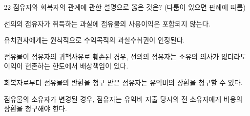 \begin{question}{22}
점유자와 회복자의 관계에 관한 설명으로 옳은 것은? (다툼이 있으면 판례에 따름)
\begin{choices}
  \item 선의의 점유자가 취득하는 과실에 점유물의 사용이익은 포함되지 않는다.
  \item 유치권자에게는 원칙적으로 수익목적의 과실수취권이 인정된다.
  \item 점유물이 점유자의 귀책사유로 훼손된 경우, 선의의 점유자는 소유의 의사가 없더라도 이익이 현존하는 한도에서 배상책임이 있다.
  \item 회복자로부터 점유물의 반환을 청구 받은 점유자는 유익비의 상환을 청구할 수 있다.
  \item 점유물의 소유자가 변경된 경우, 점유자는 유익비 지출 당시의 전 소유자에게 비용의 상환을 청구해야 한다.
\end{choices}
\end{question}
